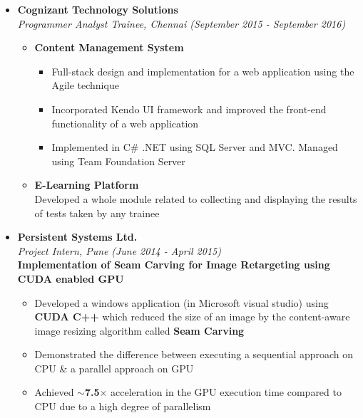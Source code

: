 \documentclass[a4paper,10pt]{article}
\newcommand{\isep}{-2 pt}
\begin{document}
\begin{itemize}
    \item \textbf{Cognizant Technology Solutions}\\
        \emph{Programmer Analyst Trainee, Chennai 
        \hfill (September 2015 - September 2016)}
        \\ [-0.6cm]
        \begin{itemize}\itemsep \isep
        \item \textbf{Content Management System}
            \begin{itemize}
                \item Full-stack design and implementation for a web application using the Agile technique
                \item Incorporated Kendo UI framework and improved the front-end functionality of a web application
                \item Implemented in C\# .NET using SQL Server and MVC. Managed using Team Foundation Server
            \end{itemize}
        \item \textbf{E-Learning Platform}\\
        Developed a whole module related to collecting and displaying the results of tests taken by any trainee
        \\[-0.5cm]
        \end{itemize}
        
    \item \textbf{Persistent Systems Ltd.} \\
    \emph{Project Intern, Pune} \hfill {\emph{(June 2014 - April 2015)}}\\
    \textbf{Implementation of Seam Carving for Image Retargeting using CUDA enabled GPU}\\ [-0.6cm]
    \begin{itemize}\itemsep \isep
    \item Developed a windows application (in Microsoft visual studio) using \textbf{CUDA C++} which reduced the size of an image by the content-aware image resizing algorithm called \textbf{Seam Carving}\\[-0.32cm]
    \item Demonstrated the difference between executing a sequential approach on CPU \& a parallel approach on GPU\\[-0.32cm]
    \item Achieved \textbf{$\sim$7.5$\times$} acceleration in the GPU execution time compared to CPU due to a high degree of parallelism
    \end{itemize}
\end{itemize}
\end{document}
